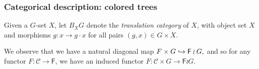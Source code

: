 \documentclass[a4paper,10pt
,draft
]{article}%
\renewcommand{\1}{\ensuremath{\mathbb{id}}}
\begin{document}
\subsubsection{Categorical description: colored trees}
\label{COMEGA_SEC}

\begin{definition}
      Given a $G$-set $X$, let $B_XG$ denote the \textit{translation category} of $X$,
      with object set $X$ and morphisms $g: x \to g\cdot x$ for all pairs $(g,x) \in G \times X$.
\end{definition}

\begin{remark}
      We observe that we have a natural diagonal map
      $
      F \times G \hookrightarrow \mathsf F \wr G,
      $
      and so for any functor $F: \mathcal C \to \mathsf F$, we have an induced functor
      $F: \mathcal C \times G \to \mathsf F \wr G$. 
\end{remark}
\end{document}
